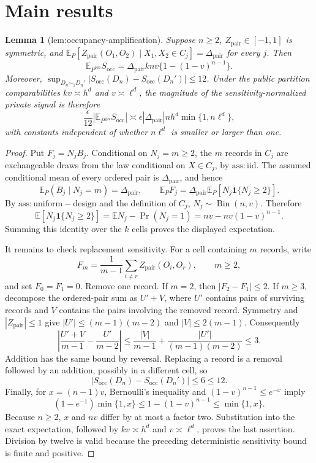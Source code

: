 \documentclass{article}
\newtheorem{lemma}{Lemma}
\begin{document}
\section{Main results}

\begin{lemma}[lem:occupancy-amplification]\label{lem:occupancy-amplification}
Suppose \(n\ge 2\), \(Z_{\mathrm{pair}}\in[-1,1]\) is symmetric, and
\(\mathbb E_P[Z_{\mathrm{pair}}(O_1,O_2)\mid X_1,X_2\in C_j]=\Delta_{\mathrm{pair}}\)
for every \(j\). Then
\[
 \mathbb E_{P^{\otimes n}}S_{\mathrm{occ}}
 =\Delta_{\mathrm{pair}}knv\{1-(1-v)^{n-1}\}.
\]
Moreover,
\(\sup_{D_n\sim_1D_n'}|S_{\mathrm{occ}}(D_n)-S_{\mathrm{occ}}(D_n')|\le 12\).
Under the public partition comparabilities \(kv\asymp h^d\) and
\(v\asymp\ell^d\), the magnitude of the sensitivity-normalized private
signal is therefore
\[
 \frac{\epsilon}{12}\left|\mathbb E_{P^{\otimes n}}S_{\mathrm{occ}}\right|
 \asymp \epsilon|\Delta_{\mathrm{pair}}|nh^d\min\{1,n\ell^d\},
\]
with constants independent of whether \(n\ell^d\) is smaller or larger than one.
\end{lemma}
\begin{proof}
Put \(F_j=N_jB_j\).  Conditional on \(N_j=m\ge2\), the \(m\) records in
\(C_j\) are exchangeable draws from the law conditional on \(X\in C_j\), by
\(\mathrm{ass:iid}\).  The assumed conditional mean of every ordered pair is
\(\Delta_{\mathrm{pair}}\), and hence
\[
 \mathbb E_P(B_j\mid N_j=m)=\Delta_{\mathrm{pair}},\qquad
 \mathbb E_PF_j=\Delta_{\mathrm{pair}}\mathbb E_P[N_j\mathbf 1\{N_j\ge2\}].
\]
By \(\mathrm{ass:uniform-design}\) and the definition of \(C_j\),
\(N_j\sim\operatorname{Bin}(n,v)\).  Therefore
\[
 \mathbb E[N_j\mathbf 1\{N_j\ge2\}]
 =\mathbb EN_j-\Pr(N_j=1)
 =nv-nv(1-v)^{n-1}.
\]
Summing this identity over the \(k\) cells proves the displayed expectation.

It remains to check replacement sensitivity.  For a cell containing \(m\)
records, write
\[
 F_m=\frac{1}{m-1}\sum_{i\ne r}Z_{\mathrm{pair}}(O_i,O_r),\qquad m\ge2,
\]
and set \(F_0=F_1=0\).  Remove one record.  If \(m=2\), then
\(|F_2-F_1|\le2\).  If \(m\ge3\), decompose the ordered-pair sum as
\(U'+V\), where \(U'\) contains pairs of surviving records and \(V\)
contains the pairs involving the removed record.  Symmetry and
\(|Z_{\mathrm{pair}}|\le1\) give
\(|U'|\le(m-1)(m-2)\) and \(|V|\le2(m-1)\).  Consequently
\[
 \left|\frac{U'+V}{m-1}-\frac{U'}{m-2}\right|
 \le \frac{|V|}{m-1}+\frac{|U'|}{(m-1)(m-2)}\le3.
\]
Addition has the same bound by reversal.  Replacing a record is a removal
followed by an addition, possibly in a different cell, so
\[
 |S_{\mathrm{occ}}(D_n)-S_{\mathrm{occ}}(D_n')|\le6\le12.
\]
Finally, for \(x=(n-1)v\), Bernoulli's inequality and
\((1-v)^{n-1}\le e^{-x}\) imply
\[
 (1-e^{-1})\min\{1,x\}
 \le1-(1-v)^{n-1}\le\min\{1,x\}.
\]
Because \(n\ge2\), \(x\) and \(nv\) differ by at most a factor two.
Substitution into the exact expectation, followed by \(kv\asymp h^d\) and
\(v\asymp\ell^d\), proves the last assertion.  Division by twelve is valid
because the preceding deterministic sensitivity bound is finite and positive.
\end{proof}
\end{document}
